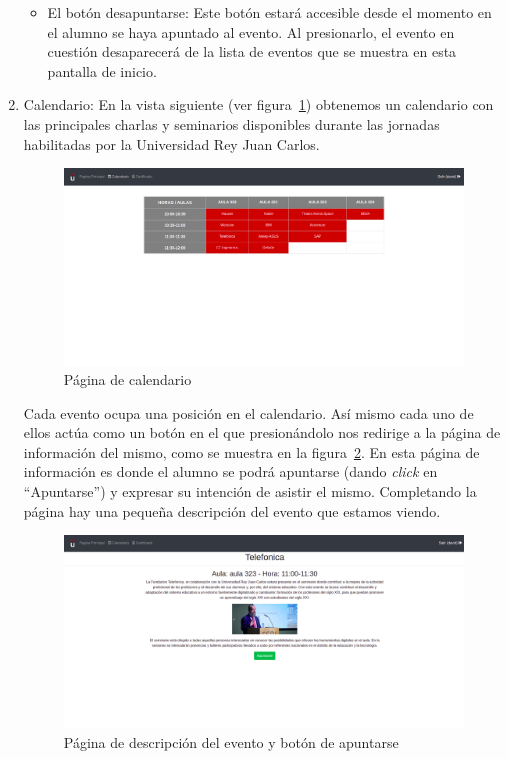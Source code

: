 \documentclass[a4paper, 12pt]{book}
\begin{document}
\begin{enumerate}
\begin{itemize}
 \item El botón desapuntarse: Este botón estará accesible desde el momento en el alumno se haya apuntado al evento. Al presionarlo, el evento en cuestión desaparecerá de la lista de eventos que se muestra en esta pantalla de inicio.
\end{itemize}
 
 \vspace{12cm}
  \item Calendario: En la vista siguiente (ver figura~\ref{fig:horario}) obtenemos un calendario con las principales charlas y seminarios disponibles durante las jornadas habilitadas por la Universidad Rey Juan Carlos. 

\begin{figure}[h!]
  	\centering
  	\includegraphics[width=16cm, keepaspectratio]{img/horario.png}
  	\caption{Página de calendario}\label{fig:horario}
	\end{figure}
  
  Cada evento ocupa una posición en el calendario. Así mismo cada uno de ellos actúa como un botón en el que presionándolo nos redirige a la página de información del mismo, como se muestra en la figura~\ref{fig:descripEvento}. En esta página de información es donde el alumno se podrá apuntarse (dando \emph{click} en ``Apuntarse'') y expresar su intención de asistir el mismo. Completando la página hay una pequeña descripción del evento que estamos viendo.
  
  \begin{figure}[h!]
  	\centering
  	\includegraphics[width=16cm, keepaspectratio]{img/descripEvento.png}
  	\caption{Página de descripción del evento y botón de apuntarse}\label{fig:descripEvento}
	\end{figure}
  

\end{enumerate}
\end{document}
